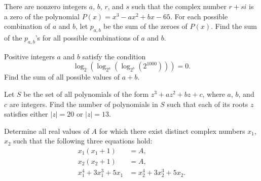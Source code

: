 \documentclass[11pt]{article}
\theoremstyle{definition}
\begin{document}
\begin{question}[name={2013 AIME I, \href{https://artofproblemsolving.com/community/c4p2969823}{Problem 10}}]
	There are nonzero integers $a$, $b$, $r$, and $s$ such that the complex number $r+si$ is a zero of the polynomial $P(x) = x^3 - ax^2 + bx - 65$. For each possible combination of $a$ and $b$, let $p_{a,b}$ be the sum of the zeroes of $P(x)$. Find the sum of the $p_{a,b}$'s for all possible combinations of $a$ and $b$.	
	
\end{question}


%	





\begin{question}[name={2013 AIME II, \href{https://artofproblemsolving.com/community/c4p3003332}{Problem 2}}]
	Positive integers $a$ and $b$ satisfy the condition\[\log_2(\log_{2^a}(\log_{2^b}(2^{1000})))=0.\]Find the sum of all possible values of $a+b$.
\end{question}


%	







\begin{question}[name={2013 AIME II, \href{https://artofproblemsolving.com/community/c4p3003348}{Problem 12}}]
	Let $S$ be the set of all polynomials of the form $z^3+az^2+bz+c$, where $a$, $b$, and $c$ are integers. Find the number of polynomials in $S$ such that each of its roots $z$ satisfies either $\left\lvert z \right\rvert = 20$ or $\left\lvert z \right\rvert = 13$.
\end{question}


%	





\begin{question}[name={2013 HMMT, Algebra, \href{https://artofproblemsolving.com/community/c129h521095p2935114}{Problem 4}}]
	Determine all real values of $A$ for which there exist distinct complex numbers $x_1$, $x_2$ such that the following three equations hold:
	\begin{align*}x_1(x_1+1)&=A,\\x_2(x_2+1)&=A,\\x_1^4+3x_1^3+5x_1&=x_2^4+3x_2^3+5x_2.\end{align*}
\end{question}
\end{document}
